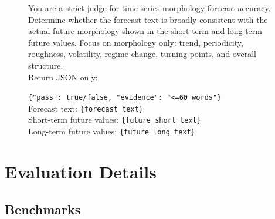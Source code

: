 \documentclass[11pt]{article}
\begin{document}
\begin{figure}[htbp]
\begin{tcolorbox}[
  boxrule=0.25pt,
  colback=promptBgSystem,
  colframe=black,
  colbacktitle=promptBgTitle,
  coltitle=black,
  title={Prompt: Forecast Accuracy Judge},
  fonttitle=\bfseries,
  fontupper=\small
]
You are a strict judge for time-series morphology forecast accuracy. \\

Determine whether the forecast text is broadly consistent with the actual future morphology shown in the short-term and long-term future values. Focus on morphology only: trend, periodicity, roughness, volatility, regime change, turning points, and overall structure. \\

Return JSON only: 

\verb|{"pass": true/false, "evidence": "<=60 words"}| \\

Forecast text: \texttt{\{forecast\_text\}} \\
Short-term future values: \texttt{\{future\_short\_text\}} \\
Long-term future values: \texttt{\{future\_long\_text\}}
\end{tcolorbox}
\end{figure}

\section{Evaluation Details}
\label{app:evaluation_details}

\subsection{Benchmarks}
\end{document}
